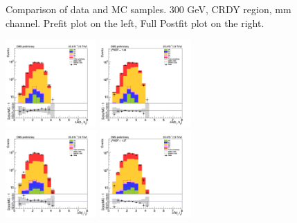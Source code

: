 \begin{figure}[tbp]
\begin{center}
    \caption{Comparison of data and MC samples. 300 GeV, CRDY region, mm channel. Prefit plot on the left,           Full Postfit plot on the right.}
    \label{fig:MCcomparisons_mm_low_CRDY_2}
  \end{center}
\end{figure}






\begin{figure}[tbp]
  \begin{center}
    \includegraphics[width=0.31\textwidth]{figures/mm_300_april18/mm_300_good_SR_bdt_sideBand_april18/dR_bjets_mm_SR_prefit_plot_apr18.png}
    \includegraphics[width=0.31\textwidth]{figures/mm_300_april18/mm_300_good_SR_bdt_sideBand_april18/dR_bjets_mm_SR_FullPostfit_plot_apr18.png}\\
    \includegraphics[width=0.31\textwidth]{figures/mm_300_april18/mm_300_good_SR_bdt_sideBand_april18/dR_leps_mm_SR_prefit_plot_apr18.png}
    \includegraphics[width=0.31\textwidth]{figures/mm_300_april18/mm_300_good_SR_bdt_sideBand_april18/dR_leps_mm_SR_FullPostfit_plot_apr18.png}\\

\end{center}
\end{figure}
